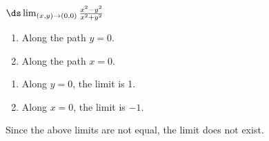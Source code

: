{$\ds \lim_{(x,y)\to(0,0)} \frac{x^2-y^2}{x^2+y^2}$
\begin{enumerate}
	\item Along the path $y=0$.
	\item	Along the path $x=0$.
\end{enumerate}}
{\begin{enumerate}
	\item Along $y=0$, the limit is 1.
	\item	Along $x=0$, the limit is $-1$.
\end{enumerate}
Since the above limits are not equal, the limit does not exist.
}